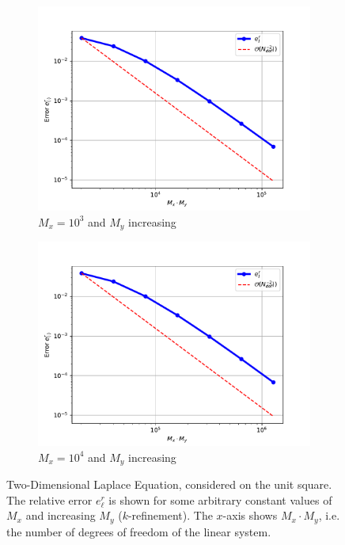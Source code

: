 \begin{figure}[t]
\begin{subfigure}{.5\textwidth}
  \includegraphics[width=\linewidth]{plots/task3bMx100.pdf}
  \caption{$M_x = 10^3$ and $M_y$ increasing}
\end{subfigure}
\begin{subfigure}{.5\textwidth}
  \centering
  \includegraphics[width=\linewidth]{plots/task3bMx500.pdf}
  \caption{$M_x = 10^4$ and $M_y$ increasing}
\end{subfigure}
\caption{Two-Dimensional Laplace Equation, considered on the unit square. The relative error $e^r_{\ell}$ is shown for some arbitrary constant values of $M_x$ and increasing $M_y$ ($k$-refinement). The $x$-axis shows $M_x \cdot M_y$, i.e. the number of degrees of freedom of the linear system.}
\label{subfigurestask3b2}
\end{figure}

